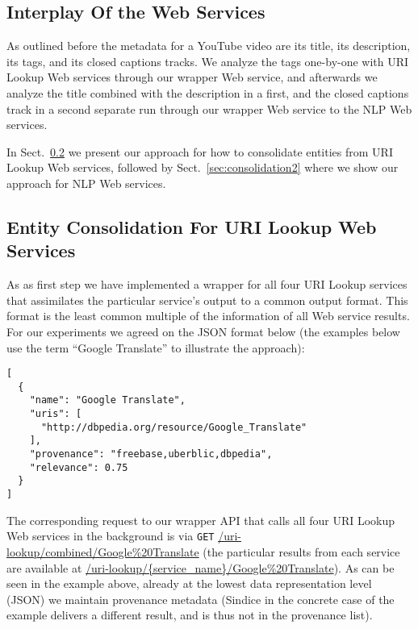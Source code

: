 \documentclass{acm_proc_article-sp}
\begin{document}
\subsection{Interplay Of the Web Services}\label{sec:interplay}
As outlined before the metadata for a YouTube video are its title, its description, its tags, and its closed captions tracks. We analyze the tags one-by-one with URI Lookup Web services through our wrapper Web service, and afterwards we analyze the title combined with the description in a first, and the closed captions track in a second separate run through our wrapper Web service to the NLP Web services.

In Sect.~\ref{sec:consolidation1} we present our approach for how to consolidate entities from URI Lookup Web services, followed by Sect.~\ref{sec:consolidation2} where we show our approach for NLP Web services.

\subsection{Entity Consolidation For URI Lookup Web Services}\label{sec:consolidation1}
As as first step we have implemented a wrapper for all four URI Lookup services that assimilates the particular service's output to a common output format. This format is the least common multiple of the information of all Web service results. For our experiments we agreed on the JSON format below (the examples below use the term ``Google Translate'' to illustrate the approach):
\begin{lstlisting}
[
  {
    "name": "Google Translate",
    "uris": [
      "http://dbpedia.org/resource/Google_Translate"
    ],
    "provenance": "freebase,uberblic,dbpedia",
    "relevance": 0.75
  }
]
\end{lstlisting} 



The corresponding request to our wrapper API that calls all four URI Lookup Web services in the background is via \texttt{GET} \url{/uri-lookup/combined/Google%20Translate} (the particular results from each service are available at \url{/uri-lookup/{service_name}/Google%
\end{document}
